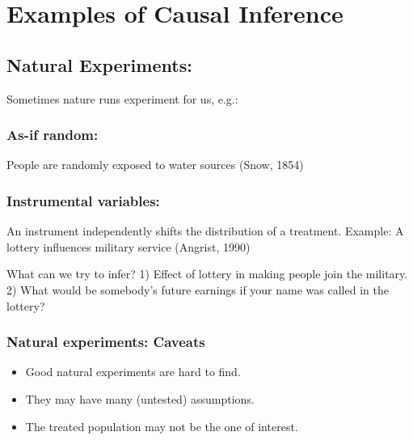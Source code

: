 \section{Examples of Causal Inference}
\subsection{Natural Experiments:}
Sometimes nature runs experiment for us, e.g.:

\subsubsection{As-if random:} People are randomly exposed to water sources (Snow, 1854)
\subsubsection{Instrumental variables:} An instrument independently shifts the distribution of a treatment.
Example: A lottery influences military service (Angrist, 1990)

What can we try to infer?
1) Effect of lottery in making people join the military.
2) What would be somebody's future earnings if your name was called in the lottery?

\subsubsection*{Natural experiments: Caveats}
\begin{itemize}
\item Good natural experiments are hard to find.
\item They may have many (untested) assumptions.
\item The treated population may not be the one of interest.
\end{itemize}


%